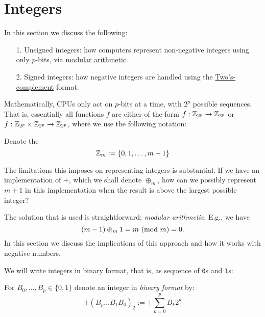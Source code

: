 
\section{Integers}
In this section we discuss the following:

\begin{itemize}
\item[1. ] Unsigned integers: how computers represent non-negative integers using only $p$-bits, via \href{https://en.wikipedia.org/wiki/Modular_arithmetic}{modular arithmetic}.


\item[2. ] Signed integers: how negative integers are handled using the \href{https://en.wikipedia.org/wiki/Two's_complement}{Two's-complement} format.

\end{itemize}
Mathematically, CPUs only act on $p$-bits at a time, with $2^p$ possible sequences. That is, essentially all functions $f$ are either of the form $f : {\mathbb Z}_{2^p} \rightarrow {\mathbb Z}_{2^p}$ or  $f : {\mathbb Z}_{2^p} \times {\mathbb Z}_{2^p} \rightarrow {\mathbb Z}_{2^p}$, where we use the following notation:

\begin{definition} Denote the
\[
{\mathbb Z}_m := \{0 , 1 , \ldots, m-1 \}
\]
\end{definition}

The limitations this imposes on representing integers is substantial. If we have an implementation of $+$, which we shall denote $\ensuremath{\oplus}_m$, how can we possibly represent $m + 1$ in this implementation when the result is above the largest possible integer?

The solution that is used is straightforward: \emph{modular arithmetic}. E.g., we have
\[
(m-1) \ensuremath{\oplus}_m 1 = m\ ({\rm mod}\ m) = 0.
\]
In this section we discuss the implications of this approach and how it works with negative numbers.

We will write integers in binary format, that is, as sequence of \texttt{0}s and \texttt{1}s:

\begin{definition} For $B_0,\ldots,B_p \in \{0,1\}$ denote an integer in \emph{binary format} by:
\[
\ensuremath{\pm}(B_p\ldots B_1B_0)_2 := \ensuremath{\pm}\sum_{k=0}^p B_k 2^k
\]
\end{definition}

